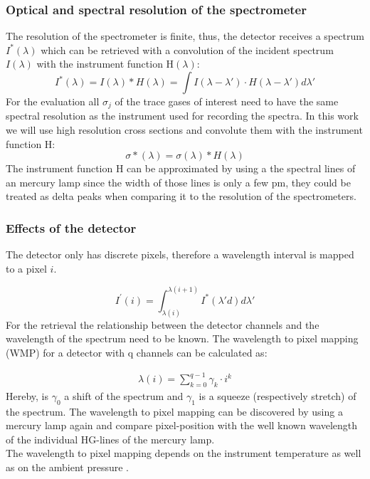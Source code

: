 \documentclass  [
  paper    = a4,
  BCOR     = 10mm,
  twoside,
  fontsize = 12pt,
  fleqn,
  toc      = bibnumbered,
  toc      = listofnumbered,
  numbers  = noendperiod,
  headings = normal,
  listof   = leveldown,
  version  = 3.03
]                                       {scrreprt}
\begin{document}
	\subsubsection*{Optical and spectral resolution of the spectrometer}
	The resolution of the spectrometer is finite, thus, the detector receives a spectrum $I^{*}\left(\lambda\right)$ which can be retrieved with a convolution of the incident spectrum $I\left(\lambda\right)$ with the instrument function H$\left(\lambda\right)$:
	\begin{equation}
	I^{*}\left(\lambda\right) = I\left(\lambda\right)*H\left(\lambda\right)=\int I\left(\lambda-\lambda{'}\right)\cdot H\left(\lambda-\lambda{'}\right)d\lambda{'}
	\end{equation} 
	For the evaluation all $\sigma_{j}$  of the trace gases of interest need to have the same spectral resolution as the instrument used for recording the spectra. In this work we will use high resolution cross sections and convolute them with the instrument function H:
	\begin{equation}
	\sigma{*}\left(\lambda\right) = \sigma\left(\lambda\right)*H\left(\lambda\right)
	\end{equation}
	The instrument function H can be approximated by using a the spectral lines of an mercury lamp since the width of those lines is only a few pm, they could be treated as delta peaks when comparing it to the resolution of the spectrometers.
	
	\subsubsection*{Effects of the detector}
	The detector only has discrete pixels, therefore a wavelength interval is mapped to a pixel $i$.
	
	\begin{equation}
	I^{'}\left(i\right) = \int_{\lambda(i)}^{\lambda(i+1)}I^{*}\left(\lambda{'}d\right)d\lambda{'}
	\end{equation}
	For the retrieval the relationship between the detector channels and the wavelength of the spectrum need to be known.
	The wavelength to pixel mapping (WMP) for a detector with q channels can be calculated as:

	\begin{eqnarray}
	\lambda(i) = \sum_{k=0}^{q-1}\gamma_{k}\cdot i^{k}
	\end{eqnarray}
	Hereby, is $\gamma_{0}$ a shift of the spectrum and $\gamma_{1}$ is a squeeze (respectively stretch) of the spectrum.
	The wavelength to pixel mapping can be discovered by using a mercury lamp again and compare pixel-position with the well known wavelength of the individual HG-lines of the mercury lamp.\\
	The wavelength to pixel mapping depends on the instrument temperature as well as on the ambient pressure \citep{lubcke2014bro}.
\end{document}
